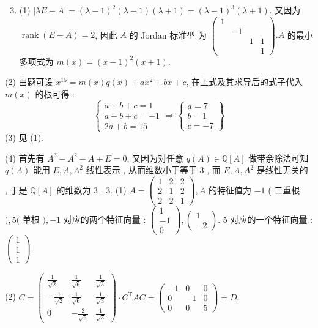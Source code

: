 \documentclass[10pt]{article}
\begin{document}
\begin{enumerate}
  \setcounter{enumi}{2}
  \item (1) $|\lambda E-A|=(\lambda-1)^{2}(\lambda-1)(\lambda+1)=(\lambda-1)^{3}(\lambda+1)$.  又因为  $\operatorname{rank}(E-A)=2$,  因此  $A$  的  Jordan  标准型   为  $\left(\begin{array}{cccc}1 & & & \\ & -1 & & \\ & & 1 & 1 \\ & & & 1\end{array}\right) . A$  的最小多项式为  $m(x)=(x-1)^{2}(x+1)$.
\end{enumerate}
(2)  由题可设  $x^{15}=m(x) q(x)+a x^{2}+b x+c$,  在上式及其求导后的式子代入  $m(x)$  的根可得 :
$$
\left\{\begin{array}{l}
a+b+c=1 \\
a-b+c=-1 \\
2 a+b=15
\end{array} \Longrightarrow\left\{\begin{array}{l}
a=7 \\
b=1 \\
c=-7
\end{array}\right\}\right.
$$
(3)  见  (1).

(4)  首先有  $A^{3}-A^{2}-A+E=0$,  又因为对任意  $q(A) \in \mathbb{Q}[A]$  做带余除法可知  $q(A)$  能用  $E, A, A^{2}$  线性表示 ,  从而维数小于等于  3 ,  而  $E, A, A^{2}$  是线性无关的 ,  于是  $\mathbb{Q}[A]$  的维数为  3 . 3. (1) $A=\left(\begin{array}{rrr}1 & 2 & 2 \\ 2 & 1 & 2 \\ 2 & 2 & 1\end{array}\right), A$  的特征值为  $-1$ ( 二重根  $), 5($  单根  $),-1$  对应的两个特征向量 : $\left(\begin{array}{r}1 \\ -1 \\ 0\end{array}\right),\left(\begin{array}{r}1 \\ -2\end{array}\right)$. 5  对应的一个特征向量 : $\left(\begin{array}{l}1 \\ 1 \\ 1\end{array}\right)$.

(2) $C=\left(\begin{array}{rrr}\frac{1}{\sqrt{2}} & \frac{1}{\sqrt{6}} & \frac{1}{\sqrt{3}} \\ -\frac{1}{\sqrt{2}} & \frac{1}{\sqrt{6}} & \frac{1}{\sqrt{3}} \\ 0 & -\frac{2}{\sqrt{6}} & \frac{1}{\sqrt{3}}\end{array}\right) \cdot C^{\mathrm{T}} A C=\left(\begin{array}{rrr}-1 & 0 & 0 \\ 0 & -1 & 0 \\ 0 & 0 & 5\end{array}\right)=D$.
\end{document}
